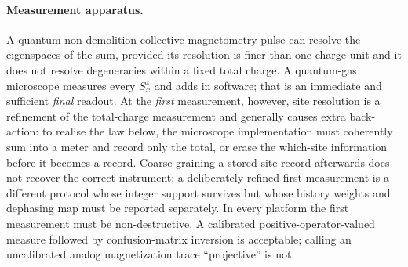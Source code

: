 \paragraph{Measurement apparatus.} A quantum-non-demolition collective
magnetometry pulse can resolve the eigenspaces of the sum, provided its
resolution is finer than one charge unit and it does not resolve degeneracies
within a fixed total charge. A quantum-gas microscope measures every $S^z_x$
and adds in software; that is an immediate and sufficient \emph{final}
readout. At the \emph{first} measurement, however, site resolution is a
refinement of the total-charge measurement and generally causes extra
back-action: to realise the law below, the microscope implementation must
coherently sum into a meter and record only the total, or erase the
which-site information before it becomes a record. Coarse-graining a stored
site record afterwards does not recover the correct instrument; a deliberately
refined first measurement is a different protocol whose integer support
survives but whose history weights and dephasing map must be reported
separately. In every platform the first measurement must be non-destructive.
A calibrated positive-operator-valued measure followed by confusion-matrix
inversion is acceptable; calling an uncalibrated analog magnetization trace
``projective'' is not.

